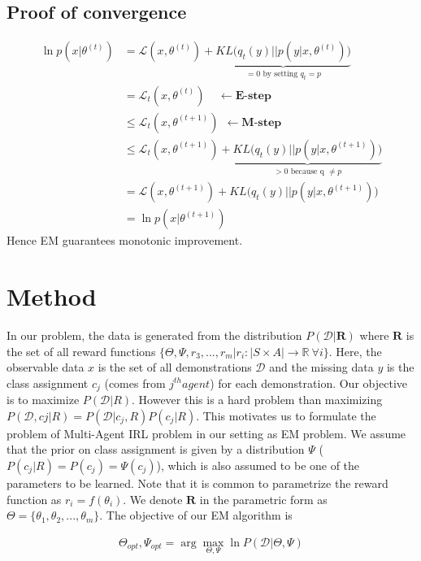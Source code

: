 \documentclass{article}[11pt]
\begin{document}
\subsection{Proof of convergence}
\begin{align*}
\ln p(x|\theta^{(t)}) &= \mathcal{L}(x,\theta^{(t)}) + \underbrace{KL \Big(q_t(y) || p(y | x,\theta^{(t)})\Big)}_{=0\text{ by setting }q_t = p}\\
&= \mathcal{L}_t(x,\theta^{(t)}) \ \ \ \ \ \leftarrow \textbf{E-step}\\
&\le \mathcal{L}_t(x,\theta^{(t+1)}) \ \ \leftarrow \textbf{M-step}\\
&\le \mathcal{L}_t(x,\theta^{(t+1)}) + \underbrace{KL \Big(q_t(y) || p(y | x,\theta^{(t+1)})\Big)}_{> 0\text{ because q }\ne p}\\
&= \mathcal{L}(x,\theta^{(t+1)}) + KL \Big(q_t(y) || p(y | x,\theta^{(t+1)})\Big)\\
&= \ln p(x|\theta^{(t+1)})
\end{align*}
Hence EM guarantees monotonic improvement. 



\section{Method}
In our problem, the data is generated from the distribution $P(\mathcal{D} | \textbf{R})$ where $\textbf{R}$ is the set of all reward functions $\{ \Theta,\Psi,r_3, ..., r_m | r_i:|S \times A| \to \mathbb{R} \ \forall i \}$. Here, the observable data $x$ is the set of all demonstrations $\mathcal{D}$ and the missing data $y$ is the class assignment $c_j$ (comes from $j^{th} agent$) for each demonstration. Our objective is to maximize $P(\mathcal{D} | R)$. However this is a hard problem than maximizing $P(\mathcal{D},cj | R) = P(\mathcal{D} |c_j, R)P(c_j|R)$. This motivates us to formulate the problem of Multi-Agent IRL problem in our setting as EM problem. We assume that the prior on class assignment is given by a distribution $\Psi$ ($P(c_j|R) =P(c_j) = \Psi(c_j)$), which is also assumed to be one of the parameters to be learned. Note that it is common to parametrize the reward function as $r_i = f(\theta_i)$. We denote $\textbf{R}$ in the parametric form as $\Theta = \{\theta_1, \theta_2, ..., \theta_m\}$. The objective of our EM algorithm is 

\begin{align}
\Theta_{opt}, \Psi_{opt} = \arg \max_{\Theta,\Psi} \ln P(\mathcal{D}|\Theta,\Psi)
\end{align}
\end{document}
